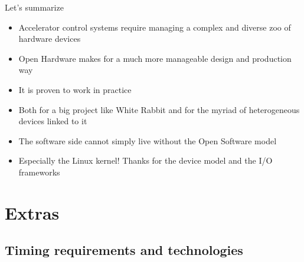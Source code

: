 \documentclass[compress,red]{beamer}
\begin{document}
\begin{frame}{Let's summarize}

\begin{itemize}
\pause \item Accelerator control systems require managing a complex and
    diverse zoo of hardware devices
\pause \item Open Hardware makes for a much more manageable design and 
    production way
\pause \item It is proven to work in practice
\pause \item Both for a big project like White Rabbit and for the myriad
    of heterogeneous devices linked to it
\pause \item The software side cannot simply live without the Open Software
    model
\pause \item Especially the Linux kernel! Thanks for the device model and
    the I/O frameworks
\end{itemize}
\end{frame}

\section{Extras}

\subsection {Timing requirements and technologies}

\end{document}
